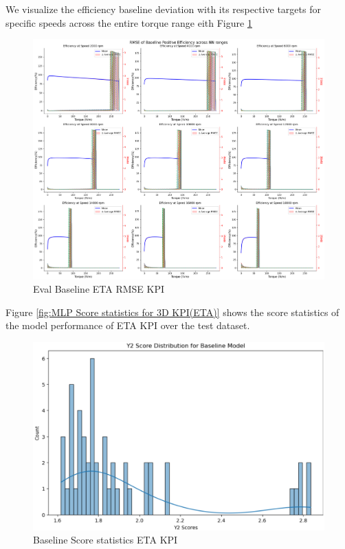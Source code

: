 \documentclass{report} %
\begin{document}
We visualize the efficiency baseline deviation with its respective targets for specific speeds across the entire torque range eith Figure \ref{fig:Eval Baseline ETA RMSE KPI}
\begin{figure}[H]
    \centering
    \includegraphics[width=1\textwidth]{./ReportImages/rmse_eta_Baseline.png} 
    \caption{Eval Baseline ETA \ac{RMSE} \ac{KPI}} 
    \label{fig:Eval Baseline ETA RMSE KPI}
\end{figure}

Figure \ref{fig:MLP Score statistics for 3D KPI(ETA)} shows the score statistics of the model performance of ETA \ac{KPI} over the test dataset.\\

\begin{figure}[H]
    \centering
    \includegraphics[width=1\textwidth]{./ReportImages/score_baseline_y2.png} 
    \caption{Baseline Score statistics ETA \ac{KPI}} 
    \label{fig:Baseline Score statistics for 3D KPI(ETA)}
\end{figure}
\end{document}
